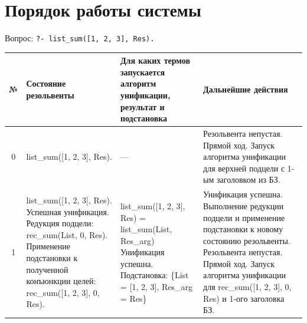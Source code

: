 \clearpage

\section{Порядок работы системы}

Вопрос: \texttt{?- list\_sum([1, 2, 3], Res).}

\begin{tabularx}{\textwidth}{|c|>{\small}X|>{\small}X|>{\small}X|}
	\hline
	\textbf{№}                                                                         &
	\textbf{Состояние резольвенты}                                                     &
	\textbf{Для каких термов запускается алгоритм унификации, результат и подстановка} &
	\textbf{Дальнейшие действия}                                                         \\
	\hline

	0                                                                                  &
	list\_sum([1, 2, 3], Res).                                                         &
	—                                                                                  &
	Резольвента непустая. \newline
	Прямой ход. \newline
	Запуск алгоритма унификации для верхней подцели с 1-ым заголовком из БЗ.             \\
	\hline

	1                                                                                  &
	list\_sum([1, 2, 3], Res). \newline
	Успешная унификация. \newline
	Редукция подцели: \newline
	rec\_sum(List, 0, Res). \newline
	Применение подстановки к полученной конъюнкции целей: \newline
	rec\_sum([1, 2, 3], 0, Res).                                                       &
	list\_sum([1, 2, 3], Res) = \newline
	list\_sum(List, Res\_arg) \newline
	Унификация успешна. \newline
	Подстановка: \newline
	\{List = [1, 2, 3], Res\_arg = Res\}                                               &
	Унификация успешна. \newline
	Выполнение редукции подцели и применение подстановки к новому состоянию резольвенты. \newline
	Резольвента непустая. \newline
	Прямой ход. \newline
	Запуск алгоритма унификации для rec\_sum([1, 2, 3], 0, Res) и 1-ого заголовка БЗ.    \\
	\hline


\end{tabularx}
